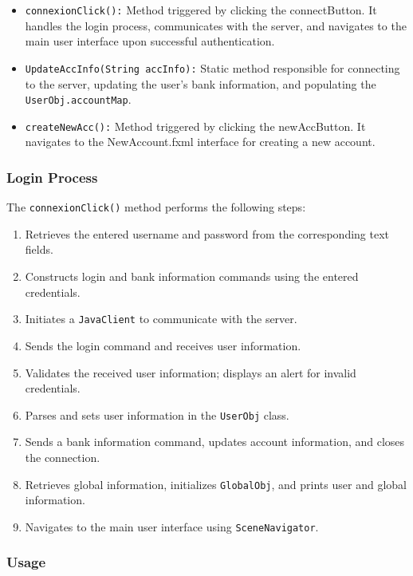 \documentclass{article}
\begin{document}
\begin{itemize}
    \item \texttt{connexionClick():} Method triggered by clicking the connectButton. It handles the login process, communicates with the server, and navigates to the main user interface upon successful authentication.
    
    \item \texttt{UpdateAccInfo(String accInfo):} Static method responsible for connecting to the server, updating the user's bank information, and populating the \texttt{UserObj.accountMap}.
    
    \item \texttt{createNewAcc():} Method triggered by clicking the newAccButton. It navigates to the NewAccount.fxml interface for creating a new account.
\end{itemize}

\subsubsection{Login Process}

The \texttt{connexionClick()} method performs the following steps:

\begin{enumerate}
    \item Retrieves the entered username and password from the corresponding text fields.
    \item Constructs login and bank information commands using the entered credentials.
    \item Initiates a \texttt{JavaClient} to communicate with the server.
    \item Sends the login command and receives user information.
    \item Validates the received user information; displays an alert for invalid credentials.
    \item Parses and sets user information in the \texttt{UserObj} class.
    \item Sends a bank information command, updates account information, and closes the connection.
    \item Retrieves global information, initializes \texttt{GlobalObj}, and prints user and global information.
    \item Navigates to the main user interface using \texttt{SceneNavigator}.
\end{enumerate}

\subsubsection{Usage}
\end{document}
